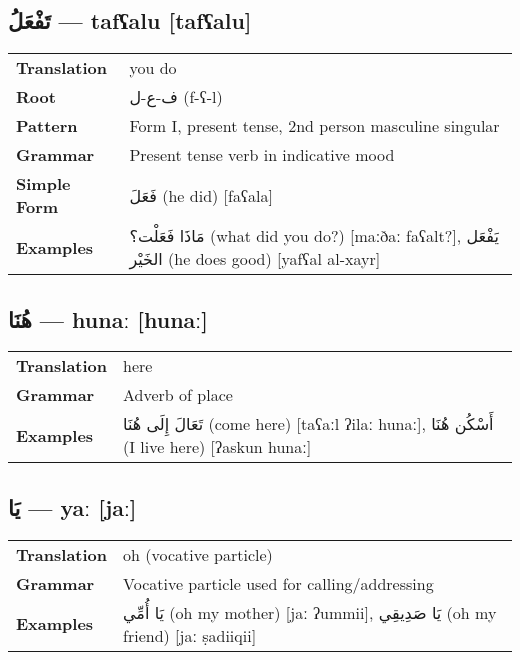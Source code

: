 \documentclass[a4paper,12pt]{article}
\begin{document}
\subsection{\textarabic{تَفْعَلُ} — \textbf{tafʕalu} [tafʕalu]}
\begin{tabular}{p{3cm}p{10cm}}
\toprule
\textbf{Translation} & you do \\
\textbf{Root} & \textarabic{ف-ع-ل} (f-ʕ-l) \\
\textbf{Pattern} & Form I, present tense, 2nd person masculine singular \\
\textbf{Grammar} & Present tense verb in indicative mood \\
\textbf{Simple Form} & \textarabic{فَعَلَ} (he did) [faʕala] \\
\textbf{Examples} & \textarabic{مَاذَا فَعَلْت؟} (what did you do?) [maːðaː faʕalt?], \textarabic{يَفْعَل الخَيْر} (he does good) [yafʕal al-xayr] \\
\bottomrule
\end{tabular}

\subsection{\textarabic{هُنَا} — \textbf{hunaː} [hunaː]}
\begin{tabular}{p{3cm}p{10cm}}
\toprule
\textbf{Translation} & here \\
\textbf{Grammar} & Adverb of place \\
\textbf{Examples} & \textarabic{تَعَالَ إِلَى هُنَا} (come here) [taʕaːl ʔilaː hunaː], \textarabic{أَسْكُن هُنَا} (I live here) [ʔaskun hunaː] \\
\bottomrule
\end{tabular}

\subsection{\textarabic{يَا} — \textbf{yaː} [jaː]}
\begin{tabular}{p{3cm}p{10cm}}
\toprule
\textbf{Translation} & oh (vocative particle) \\
\textbf{Grammar} & Vocative particle used for calling/addressing \\
\textbf{Examples} & \textarabic{يَا أُمِّي} (oh my mother) [jaː ʔummii], \textarabic{يَا صَدِيقِي} (oh my friend) [jaː ṣadiiqii] \\
\bottomrule
\end{tabular}
\end{document}

